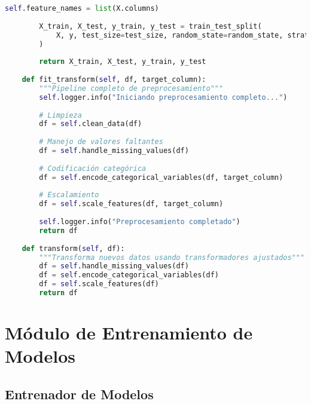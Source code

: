 \begin{lstlisting}[language=Python, caption=Módulo principal de preprocesamiento]
        self.feature_names = list(X.columns)
        
        X_train, X_test, y_train, y_test = train_test_split(
            X, y, test_size=test_size, random_state=random_state, stratify=y
        )
        
        return X_train, X_test, y_train, y_test
    
    def fit_transform(self, df, target_column):
        """Pipeline completo de preprocesamiento"""
        self.logger.info("Iniciando preprocesamiento completo...")
        
        # Limpieza
        df = self.clean_data(df)
        
        # Manejo de valores faltantes
        df = self.handle_missing_values(df)
        
        # Codificación categórica
        df = self.encode_categorical_variables(df, target_column)
        
        # Escalamiento
        df = self.scale_features(df, target_column)
        
        self.logger.info("Preprocesamiento completado")
        return df
    
    def transform(self, df):
        """Transforma nuevos datos usando transformadores ajustados"""
        df = self.handle_missing_values(df)
        df = self.encode_categorical_variables(df)
        df = self.scale_features(df)
        return df
\end{lstlisting}

\section{Módulo de Entrenamiento de Modelos}

\subsection{Entrenador de Modelos}

